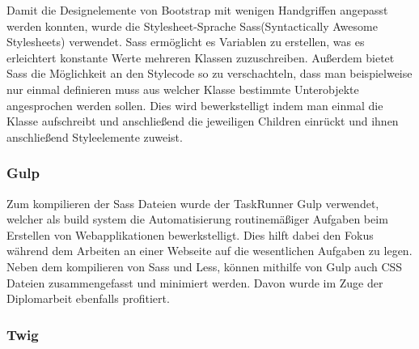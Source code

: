 Damit die Designelemente von Bootstrap mit wenigen Handgriffen angepasst werden konnten, wurde die Stylesheet-Sprache Sass(Syntactically Awesome Stylesheets) verwendet. Sass ermöglicht es Variablen zu erstellen, was es erleichtert konstante Werte mehreren Klassen zuzuschreiben. Außerdem bietet Sass die Möglichkeit an den Stylecode so zu verschachteln, dass man beispielweise nur einmal definieren muss aus welcher Klasse bestimmte Unterobjekte angesprochen werden sollen. Dies wird bewerkstelligt indem man einmal die Klasse aufschreibt und anschließend die jeweiligen Children einrückt und ihnen anschließend Styleelemente zuweist.

    \subsubsection{Gulp}

Zum kompilieren der Sass Dateien wurde der TaskRunner Gulp verwendet, welcher als build system die Automatisierung routinemäßiger Aufgaben beim Erstellen von Webapplikationen bewerkstelligt. Dies hilft dabei den Fokus während dem Arbeiten an einer Webseite auf die wesentlichen Aufgaben zu legen. Neben dem kompilieren von Sass und Less, können mithilfe von Gulp auch CSS Dateien zusammengefasst und minimiert werden. Davon wurde im Zuge der Diplomarbeit ebenfalls profitiert.

    \subsubsection{Twig}

